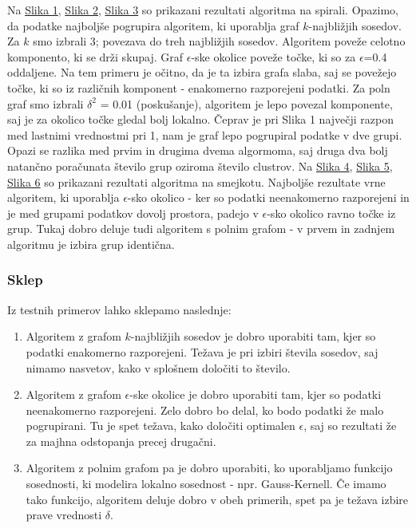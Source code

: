 \documentclass[a4paper, 10pt]{article}
\begin{document}
Na \underline{Slika 1}, \underline{Slika 2}, \underline{Slika 3} so prikazani rezultati algoritma na spirali. Opazimo, da podatke najboljše pogrupira algoritem, ki uporablja graf $k$-najbližjih sosedov. Za $k$ smo izbrali 3; povezava do treh najbližjih sosedov. Algoritem poveže celotno komponento, ki se drži skupaj. Graf $\epsilon$-ske okolice poveže točke, ki so za $\epsilon$=0.4 oddaljene. Na tem primeru je očitno, da je ta izbira grafa slaba, saj se povežejo točke, ki so iz različnih komponent - enakomerno razporejeni podatki. Za poln graf smo izbrali $\delta^2$ = 0.01 (poskušanje), algoritem je lepo povezal komponente, saj je za okolico točke gledal bolj lokalno. Čeprav je pri Slika 1 največji razpon med lastnimi vrednostmi pri 1, nam je graf lepo pogrupiral podatke v dve grupi. Opazi se razlika med prvim in drugima dvema algormoma, saj druga dva bolj natančno poračunata število grup oziroma število clustrov.
Na \underline{Slika 4}, \underline{Slika 5}, \underline{Slika 6} so prikazani rezultati algoritma na smejkotu. Najboljše rezultate vrne algoritem, ki uporablja $\epsilon$-sko okolico - ker so podatki neenakomerno razporejeni in je med grupami podatkov dovolj prostora, padejo v $\epsilon$-sko okolico ravno točke iz grup. Tukaj dobro deluje tudi algoritem s polnim grafom - v prvem in zadnjem algoritmu je izbira grup identična.

\subsubsection{Sklep}

Iz testnih primerov lahko sklepamo naslednje:
\begin{enumerate}
\item Algoritem z grafom $k$-najbližjih sosedov je dobro uporabiti tam, kjer so podatki enakomerno razporejeni. Težava je pri izbiri števila sosedov, saj nimamo nasvetov, kako v splošnem določiti to število.
\item Algoritem z grafom $\epsilon$-ske okolice je dobro uporabiti tam, kjer so podatki neenakomerno razporejeni. Zelo dobro bo delal, ko bodo podatki že malo pogrupirani. Tu je spet težava, kako določiti optimalen $\epsilon$, saj so rezultati že za majhna odstopanja precej drugačni.
\item Algoritem z polnim grafom pa je dobro uporabiti, ko uporabljamo funkcijo sosednosti, ki modelira lokalno sosednost - npr. Gauss-Kernell. Če imamo tako funkcijo, algoritem deluje dobro v obeh primerih, spet pa je težava izbire prave vrednosti $\delta$. 
\end{enumerate}
\end{document}
